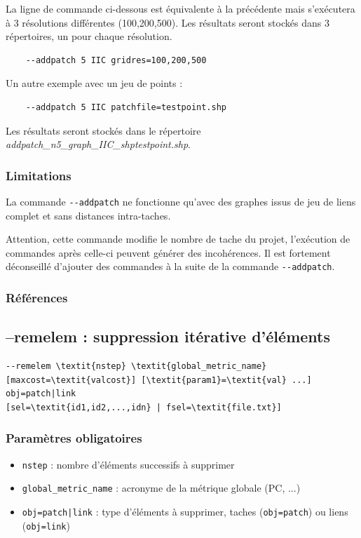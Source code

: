 \documentclass[a4paper,10pt]{report}
\begin{document}
La ligne de commande ci-dessous est équivalente à la précédente mais s'exécutera à 3 résolutions différentes (100,200,500). Les résultats seront stockés dans 3 répertoires, un pour chaque résolution.
\begin{Verbatim}
	--addpatch 5 IIC gridres=100,200,500
\end{Verbatim}

Un autre exemple avec un jeu de points :
\begin{Verbatim}
	--addpatch 5 IIC patchfile=testpoint.shp
\end{Verbatim}
Les résultats seront stockés dans le répertoire \textit{addpatch\_n5\_graph\_IIC\_shptestpoint.shp}.

\subsubsection{Limitations}
La commande \verb|--addpatch| ne fonctionne qu'avec des graphes issus de jeu de liens complet et sans distances intra-taches.

Attention, cette commande modifie le nombre de tache du projet, l'exécution de commandes après celle-ci peuvent générer des incohérences.
Il est fortement déconseillé d'ajouter des commandes à la suite de la commande \verb|--addpatch|.

\subsubsection{Références}
\cite{2015_addpatch_rainette, 2014_LUP}


\subsection{--remelem : suppression itérative d'éléments}
\begin{Verbatim}[commandchars=\\\{\}]
--remelem \textit{nstep} \textit{global_metric_name} [maxcost=\textit{valcost}] [\textit{param1}=\textit{val} ...] obj=patch|link
[sel=\textit{id1,id2,...,idn} | fsel=\textit{file.txt}]
\end{Verbatim}

\subsubsection{Paramètres obligatoires}
\begin{itemize}
	\item \verb|nstep| : nombre d’éléments successifs à supprimer
	\item \verb|global_metric_name| : acronyme de la métrique globale (PC, ...)
	\item \verb+obj=patch|link+ : type d'éléments à supprimer, taches (\verb+obj=patch+) ou liens (\verb+obj=link+)
\end{itemize}
\end{document}
